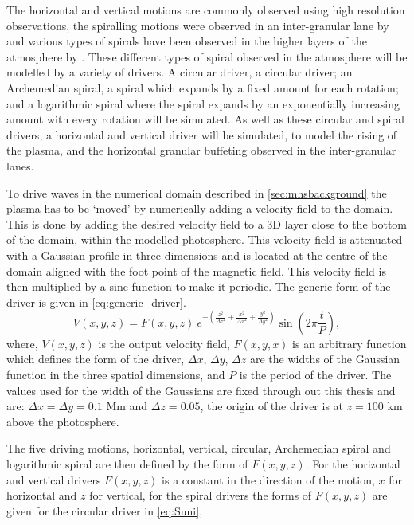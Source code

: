 The horizontal and vertical motions are commonly observed using high resolution observations, the spiralling motions were observed in an inter-granular lane by \cite{bonet2008, bonet2010} and various types of spirals have been observed in the higher layers of the atmosphere by \cite{wedemeyer-bohm2009,wedemeyer-bohm2012,wedemeyer2013}.
These different types of spiral observed in the atmosphere will be modelled by a variety of drivers.
A circular driver, a circular driver; an Archemedian spiral, a spiral which expands by a fixed amount for each rotation; and a logarithmic spiral where the spiral expands by an exponentially increasing amount with every rotation will be simulated.
As well as these circular and spiral drivers, a horizontal and vertical driver will be simulated, to model the rising of the plasma, and the horizontal granular buffeting observed in the inter-granular lanes.

To drive waves in the numerical domain described in \cref{sec:mhsbackground} the plasma has to be `moved' by numerically adding a velocity field to the domain.
This is done by adding the desired velocity field to a 3D layer close to the bottom of the domain, within the modelled photosphere.
This velocity field is attenuated with a Gaussian profile in three dimensions and is located at the centre of the domain aligned with the foot point of the magnetic field.
This velocity field is then multiplied by a sine function to make it periodic. The generic form of the driver is given in \cref{eq:generic_driver}.
\begin{equation}
	V(x,y,z) = F(x,y,z) \ e^{-\left(\frac{z^2}{\Delta z^2} + \frac{x^2}{\Delta x^2} + \frac{y^2}{\Delta y^2}\right)} \sin \left(2\pi \frac{t}{P}\right),
	\label{eq:generic_driver}
\end{equation}
where, $V(x,y,z)$ is the output velocity field, $F(x,y,x)$ is an arbitrary function which defines the form of the driver, $\Delta x$, $\Delta y$, $\Delta z$ are the widths of the Gaussian function in the three spatial dimensions, and $P$ is the period of the driver.
The values used for the width of the Gaussians are fixed through out this thesis and are: $\Delta x = \Delta y = 0.1$ Mm and $\Delta z = 0.05$, the origin of the driver is at $z = 100$ km above the photosphere.

The five driving motions, horizontal, vertical, circular, Archemedian spiral and logarithmic spiral are then defined by the form of $F(x,y,z)$. For the horizontal and vertical drivers $F(x,y,z)$ is a constant in the direction of the motion, $x$ for horizontal and $z$ for vertical, for the spiral drivers the forms of $F(x,y,z)$ are given for the circular driver in \cref{eq:Suni},

